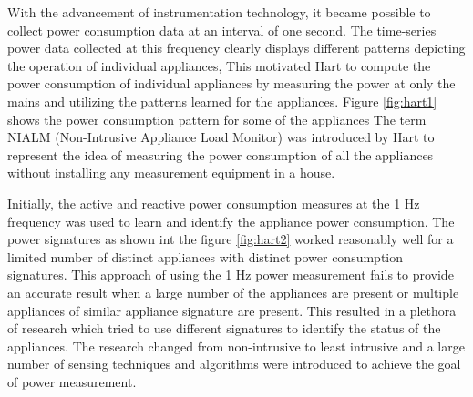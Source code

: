 With the advancement of instrumentation technology, it became possible to collect power consumption data at an interval of one second. The time-series power data collected at this frequency clearly displays different patterns depicting the operation of individual appliances, 
This motivated Hart \cite{hart} to compute the power consumption of individual appliances by measuring the power at only the mains and utilizing the patterns learned for the appliances. 
Figure \ref{fig:hart1} shows the power consumption pattern for some of the appliances
The term NIALM (Non-Intrusive Appliance Load Monitor) was introduced by Hart to represent the idea of measuring the power consumption of all the appliances without installing any measurement equipment in a house. 

Initially, the active and reactive power consumption measures at the 1 Hz frequency was used to learn and identify the appliance power consumption. The power signatures as shown int the figure \ref{fig:hart2} worked reasonably well for a limited number of distinct appliances with distinct power consumption signatures. This approach of using the 1 Hz power measurement fails to provide an accurate result when a large number of the appliances are present or multiple appliances of similar appliance signature are present. This resulted in a plethora of research which tried to use different signatures to identify the status of the appliances. The research changed from non-intrusive to least intrusive and a large number of sensing techniques and algorithms were introduced to achieve the goal of power measurement. 


